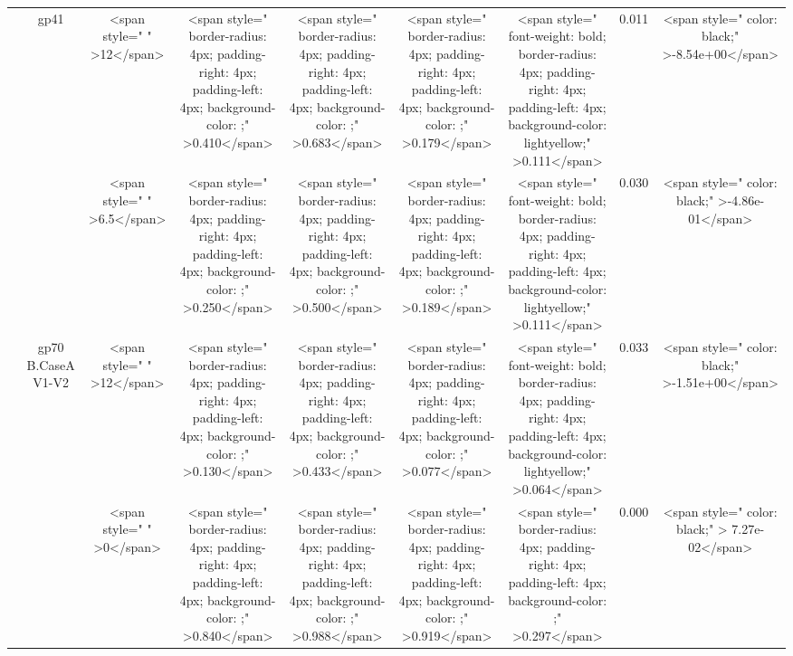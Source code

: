 \begin{tabular}{c|c|c|c|c|c|c|c|c}
\cline{3-9}
 & \multirow{-3}{*}{\centering\arraybackslash gp41} & <span style="     " >12</span> & <span style="     border-radius: 4px; padding-right: 4px; padding-left: 4px; background-color: ;" >0.410</span> & <span style="     border-radius: 4px; padding-right: 4px; padding-left: 4px; background-color: ;" >0.683</span> & <span style="     border-radius: 4px; padding-right: 4px; padding-left: 4px; background-color: ;" >0.179</span> & <span style=" font-weight: bold;    border-radius: 4px; padding-right: 4px; padding-left: 4px; background-color: lightyellow;" >0.111</span> & 0.011 & <span style="     color: black;" >-8.54e+00</span>\\
\cline{2-9}
 &  & <span style="     " >6.5</span> & <span style="     border-radius: 4px; padding-right: 4px; padding-left: 4px; background-color: ;" >0.250</span> & <span style="     border-radius: 4px; padding-right: 4px; padding-left: 4px; background-color: ;" >0.500</span> & <span style="     border-radius: 4px; padding-right: 4px; padding-left: 4px; background-color: ;" >0.189</span> & <span style=" font-weight: bold;    border-radius: 4px; padding-right: 4px; padding-left: 4px; background-color: lightyellow;" >0.111</span> & 0.030 & <span style="     color: black;" >-4.86e-01</span>\\
\cline{3-9}
 & \multirow{-2}{*}{\centering\arraybackslash gp70 B.CaseA V1-V2} & <span style="     " >12</span> & <span style="     border-radius: 4px; padding-right: 4px; padding-left: 4px; background-color: ;" >0.130</span> & <span style="     border-radius: 4px; padding-right: 4px; padding-left: 4px; background-color: ;" >0.433</span> & <span style="     border-radius: 4px; padding-right: 4px; padding-left: 4px; background-color: ;" >0.077</span> & <span style=" font-weight: bold;    border-radius: 4px; padding-right: 4px; padding-left: 4px; background-color: lightyellow;" >0.064</span> & 0.033 & <span style="     color: black;" >-1.51e+00</span>\\
\cline{2-9}
 &  & <span style="     " >0</span> & <span style="     border-radius: 4px; padding-right: 4px; padding-left: 4px; background-color: ;" >0.840</span> & <span style="     border-radius: 4px; padding-right: 4px; padding-left: 4px; background-color: ;" >0.988</span> & <span style="     border-radius: 4px; padding-right: 4px; padding-left: 4px; background-color: ;" >0.919</span> & <span style="     border-radius: 4px; padding-right: 4px; padding-left: 4px; background-color: ;" >0.297</span> & 0.000 & <span style="     color: black;" > 7.27e-02</span>\\

\end{tabular}
